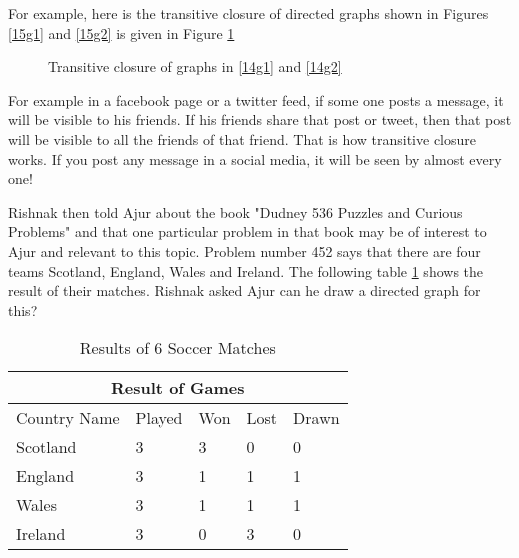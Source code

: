 For example, here is the transitive closure of directed graphs shown in Figures \ref{15g1} and \ref{15g2} is given in Figure \ref{15g4}

\begin{figure}
\begin{center}
\caption{ Transitive closure of graphs in \ref{14g1} and \ref{14g2}}\label{15g4}
\end{center}
\end{figure}

For example in a facebook page or a twitter feed, if some one posts a message, it will be visible to his friends. If his friends share that post or tweet, then that post will be visible to all the friends of that friend. That is how transitive closure works. If you post any message in a social media, it will be seen
by almost every one!


Rishnak then told Ajur about the book "Dudney 536 Puzzles and Curious Problems" and that one particular problem in that book may be of interest to Ajur and relevant to this topic. Problem number 452 says that there are four teams Scotland, England, Wales and Ireland. The following table \ref {14t1} shows the result of their matches. Rishnak asked Ajur can he draw a directed graph for this? 
\begin{table}
\begin{center}
\begin{tabular}{ |p{3cm}||p{1.5cm}||p{1.5cm}||p{1.5cm}||p{1.5cm}||  }
 \hline
 \multicolumn{5}{|c|}{Result of Games} \\
 \hline
 Country Name & Played &Won&Lost&Drawn\\
 \hline
 Scotland  & 3    &3&0&0\\
 England& 3& 1 &1&1\\
 Wales&3 &1&1&1\\
 Ireland    &3 &0&3&0\\
 
 \hline
\end{tabular}
\caption{Results of 6 Soccer Matches}\label{14t1}
\end{center}
\end{table}


